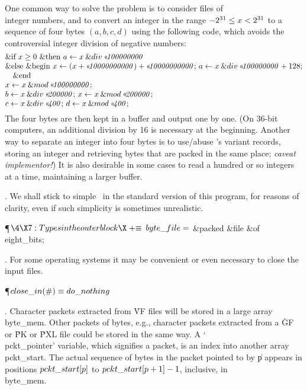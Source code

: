 One common way to solve the problem is to consider files of \\{integer}
numbers, and to convert an integer in the range $-2^{31}\L x<2^{31}$ to
a sequence of four bytes $(a,b,c,d)$ using the following code, which
avoids the controversial integer division of negative numbers:
$$\vbox{\halign{#\hfil\cr
 \&{if} $\|x\G0$ \&{then} $\|a\K\|x\mathbin{\&{div}}\O{100000000}$\cr
  \&{else}  \&{begin} $\|x\K(\|x+\O{10000000000})+\O{10000000000}$; $\|a\K\|x%
\mathbin{\&{div}}\O{100000000}+128$;\cr
\quad  \&{end} \cr
$\|x\K\|x\mathbin{\&{mod}}\O{100000000}$;\cr
$\|b\K\|x\mathbin{\&{div}}\O{200000}$; $\|x\K\|x\mathbin{\&{mod}}\O{200000}$;%
\cr
$\|c\K\|x\mathbin{\&{div}}\O{400}$; $\|d\K\|x\mathbin{\&{mod}}\O{400}$;\cr}}$$
The four bytes are then kept in a buffer and output one by one. (On 36-bit
computers, an additional division by 16 is necessary at the beginning.
Another way to separate an integer into four bytes is to use/abuse
\PASCAL's variant records, storing an integer and retrieving bytes that are
packed in the same place; {\sl caveat implementor!\/}) It is also desirable
in some cases to read a hundred or so integers at a time, maintaining a
larger buffer.

\fi

. We shall stick to simple \PASCAL\ in the standard version of this
program,
for reasons of clarity, even if such simplicity is sometimes unrealistic.

\Y\P$\4\X7:Types in the outer block\X\mathrel{+}\S$\6
$\\{byte\_file}=$\1\5
\&{packed} \&{file} \1\&{of}\5
\\{eight\_bits};\2\2\par
\fi

. For some operating systems it may be convenient or even necessary to
close the input files.

\Y\P\D {}$\\{close\_in}(\#)\S\\{do\_nothing}$\par
\fi

. Character packets extracted from \.{VF} files will be stored in a large
array \\{byte\_mem}. Other packets of bytes, e.g., character packets
extracted from a \.{GF} or \.{PK} or \.{PXL} file could be stored in the
same way. A `\\{pckt\_pointer}' variable, which signifies a packet,
is an index into another array \\{pckt\_start}. The actual sequence of bytes
in the packet pointed to by \|p appears in positions $\\{pckt\_start}[\|p]$ to
$\\{pckt\_start}[\|p+1]-1$, inclusive, in \\{byte\_mem}.

